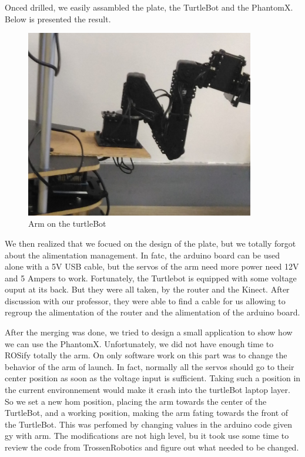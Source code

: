 \documentclass[aps,letterpaper,11pt]{revtex4}
\begin{document}
Onced drilled, we easily assambled the plate, the TurtleBot and the PhantomX. Below is presented the result.
\begin{figure}
	\centering
	\includegraphics[width=10cm]{armfixed.png}
	\caption{Arm on the turtleBot}
	\label{fig: wood design}    
\end{figure} 

 We then realized that we focued on the design of the plate, but we totally forgot about the alimentation management. In fatc, the arduino board can be used alone with a 5V USB cable, but the servos of the arm need more power need 12V and 5 Ampers to work.
Fortunately, the Turtlebot is equipped with some voltage ouput at its back. But they were all taken, by the router and the Kinect. After discussion with our professor, they were able to find a cable for us allowing to regroup the alimentation of the router and the alimentation of the arduino board.

After the merging was done, we tried to design a small application to show how we can use the PhantomX. Unfortunately, we did not have enough time to ROSify totally the arm. On only software work on this part was to change the behavior of the arm of launch. In fact, normally all the servos should go to their center position as soon as the voltage input is sufficient. Taking such a position in the current environnement would make it crash into the turtleBot laptop layer. So we set a new hom position, placing the arm towards the center of the TurtleBot, and a working position, making the arm fating towards the front of the TurtleBot. This was perfomed by changing values in the arduino code given gy with arm. The modifications are not high level, bu it took use some time to review the code from TrossenRobotics and figure out what needed to be changed.
\end{document}
